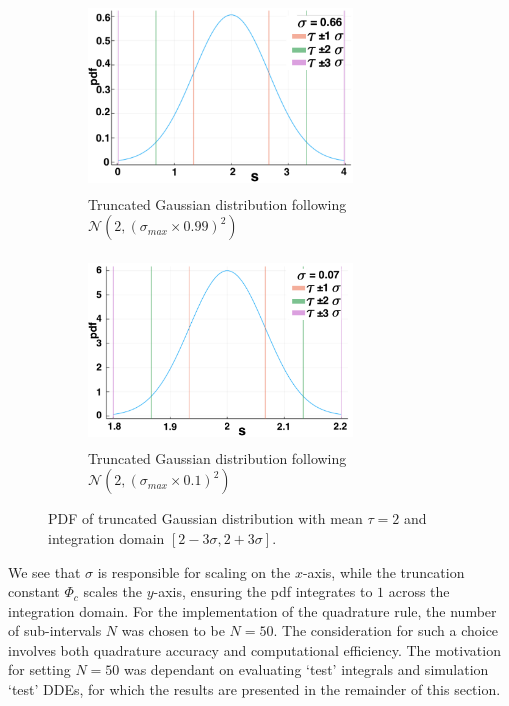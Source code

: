 \begin{figure}[H]
    \centering
    \begin{subfigure}[b]{0.45\textwidth}
        \centering
        \includegraphics[width=7cm,height=5cm]{t2sig1.png}
        \caption{Truncated Gaussian distribution following $\mathcal{N}(2,(\sigma_{max}\times0.99)^2)$}
        \label{}
    \end{subfigure}
    \hfill
    \begin{subfigure}[b]{0.45\textwidth}
        \centering
        \includegraphics[width=7cm,height=5cm]{t2sig2.png}
        \caption{Truncated Gaussian distribution following $\mathcal{N}(2,(\sigma_{max}\times0.1)^2)$}
        \label{}
    \end{subfigure}
    \caption{PDF of truncated Gaussian distribution with mean $\tau=2$ and integration domain $[2-3\sigma,2+3\sigma]$.}
    \label{fig:pdf2}
\end{figure}
We see that $\sigma$ is responsible for scaling on the $x$-axis, while the truncation constant $\Phi_c$ scales the $y$-axis, ensuring the pdf integrates to $1$ across the integration domain. For the implementation of the quadrature rule, the number of sub-intervals $N$ was chosen to be $N=50$. The consideration for such a choice involves both quadrature accuracy and computational efficiency. The motivation for setting $N=50$ was dependant on evaluating `test' integrals and simulation `test' DDEs, for which the results are presented in the remainder of this section.

